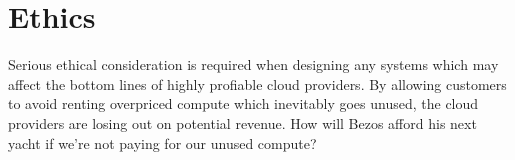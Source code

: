 \chapter{Ethics}
Serious ethical consideration is required when designing any systems which may affect the bottom lines of highly profiable cloud providers. By allowing customers to avoid renting overpriced compute which inevitably goes unused, the cloud providers are losing out on potential revenue. How will Bezos afford his next yacht if we're not paying for our unused compute?
